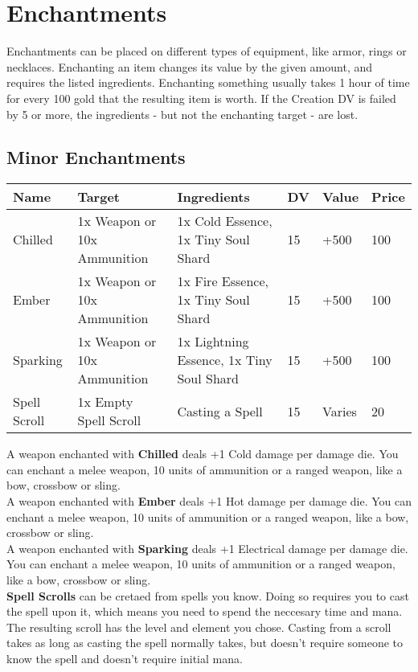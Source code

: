 \section{Enchantments}

Enchantments can be placed on different types of equipment, like armor, rings or necklaces. Enchanting an item changes its value by the given amount, and requires the listed ingredients. Enchanting something usually takes 1 hour of time for every 100 gold that the resulting item is worth. If the Creation DV is failed by 5 or more, the ingredients - but not the enchanting target - are lost.\\


\subsection{Minor Enchantments}
\begin{longtable}{l | p{2.5cm} | p{2.5cm}| l |l | l }
	Name & Target & Ingredients & DV & Value & Price\\ \hline
	Chilled & 1x Weapon or 10x Ammunition & 1x Cold Essence, 1x Tiny Soul Shard & 15 & +500 & 100\\
	Ember & 1x Weapon or 10x Ammunition & 1x Fire Essence, 1x Tiny Soul Shard & 15 & +500 & 100\\
	Sparking & 1x Weapon or 10x Ammunition & 1x Lightning Essence, 1x Tiny Soul Shard & 15 & +500 & 100\\
	Spell Scroll & 1x Empty Spell Scroll & Casting a Spell & 15 & Varies & 20\\
\end{longtable}

A weapon enchanted with \textbf{Chilled} deals +1 Cold damage per damage die. You can enchant a melee weapon, 10 units of ammunition or a ranged weapon, like a bow, crossbow or sling.\\


A weapon enchanted with \textbf{Ember} deals +1 Hot damage per damage die. You can enchant a melee weapon, 10 units of ammunition or a ranged weapon, like a bow, crossbow or sling.\\


A weapon enchanted with \textbf{Sparking} deals +1 Electrical damage per damage die. You can enchant a melee weapon, 10 units of ammunition or a ranged weapon, like a bow, crossbow or sling.\\


\textbf{Spell Scrolls} can be cretaed from spells you know. Doing so requires you to cast the spell upon it, which means you need to spend the neccesary time and mana. The resulting scroll has the level and element you chose. Casting from a scroll takes as long as casting the spell normally takes, but doesn't require someone to know the spell and doesn't require initial mana.